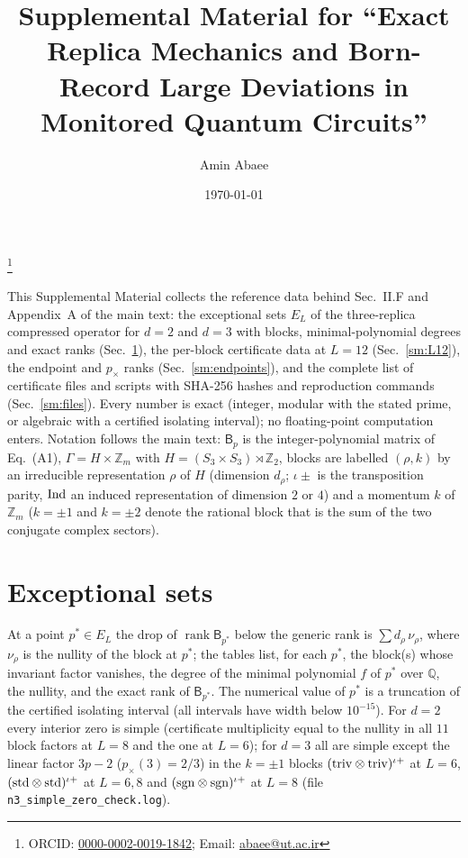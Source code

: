 \documentclass[aps,prx,reprint,superscriptaddress,nobibnotes,longbibliography]{revtex4-2}
\newcommand{\rk}{\operatorname{rank}}
\begin{document}
\title{Supplemental Material for ``Exact Replica Mechanics and Born-Record Large Deviations in Monitored Quantum Circuits''}
\author{Amin Abaee}
\thanks{ORCID: \href{https://orcid.org/0000-0002-0019-1842}{0000-0002-0019-1842}; Email: \href{mailto:abaee@ut.ac.ir}{abaee@ut.ac.ir}}
\date{\today}
\maketitle

This Supplemental Material collects the reference data behind Sec.~II.F and Appendix~A of the main text: the exceptional sets $E_L$ of the three-replica compressed operator for $d=2$ and $d=3$ with blocks, minimal-polynomial degrees and exact ranks (Sec.~\ref{sm:E}), the per-block certificate data at $L=12$ (Sec.~\ref{sm:L12}), the endpoint and $p_\times$ ranks (Sec.~\ref{sm:endpoints}), and the complete list of certificate files and scripts with SHA-256 hashes and reproduction commands (Sec.~\ref{sm:files}).  Every number is exact (integer, modular with the stated prime, or algebraic with a certified isolating interval); no floating-point computation enters.  Notation follows the main text: $\mathsf B_p$ is the integer-polynomial matrix of Eq.~(A1), $\Gamma=H\times\mathbb Z_m$ with $H=(S_3\times S_3)\rtimes\mathbb Z_2$, blocks are labelled $(\rho,k)$ by an irreducible representation $\rho$ of $H$ (dimension $d_\rho$; $\iota\pm$ is the transposition parity, ${\rm Ind}$ an induced representation of dimension $2$ or $4$) and a momentum $k$ of $\mathbb Z_m$ ($k=\pm1$ and $k=\pm2$ denote the rational block that is the sum of the two conjugate complex sectors).

\section{Exceptional sets}
\label{sm:E}

At a point $p^*\in E_L$ the drop of $\rk\mathsf B_{p^*}$ below the generic rank is $\sum d_\rho\,\nu_\rho$, where $\nu_\rho$ is the nullity of the block at $p^*$; the tables list, for each $p^*$, the block(s) whose invariant factor vanishes, the degree of the minimal polynomial $f$ of $p^*$ over $\mathbb Q$, the nullity, and the exact rank of $\mathsf B_{p^*}$.  The numerical value of $p^*$ is a truncation of the certified isolating interval (all intervals have width below $10^{-15}$).  For $d=2$ every interior zero is simple (certificate multiplicity equal to the nullity in all $11$ block factors at $L=8$ and the one at $L=6$); for $d=3$ all are simple except the linear factor $3p-2$ ($p_\times(3)=2/3$) in the $k=\pm1$ blocks $({\rm triv}\otimes{\rm triv})^{\iota+}$ at $L=6$, $({\rm std}\otimes{\rm std})^{\iota+}$ at $L=6,8$ and $({\rm sgn}\otimes{\rm sgn})^{\iota+}$ at $L=8$ (file \texttt{n3\_simple\_zero\_check.log}).
\end{document}
